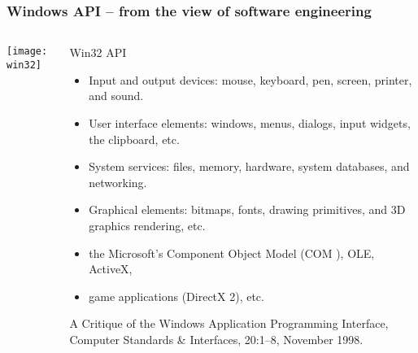 \begin{frame}[plain]
	\frametitle{Windows API -- from the view of software engineering}
	
	
	
	\begin{columns}
		
		\begin{column}{.4\textwidth}
			
			\texttt{[image: win32]}
			
		\end{column}
		
		\begin{column}{.6\textwidth}
			
			Win32 API
			
			\begin{itemize}
				\item Input and output devices: mouse, keyboard, pen, screen,
				printer, and sound.
				
				\item User interface elements: windows, menus, dialogs, input
				widgets, the clipboard, etc.
				
				\item System services: files, memory, hardware, system
				databases, and networking.
				
				\item Graphical elements: bitmaps, fonts, drawing primitives, and 3D graphics rendering, etc.
				
				\item the Microsoft's Component Object Model (COM ), OLE, ActiveX,
				
				\item game applications (DirectX 2), etc.
				
				
			\end{itemize}
			
			\tiny A Critique of the Windows	Application Programming Interface, Computer Standards \& Interfaces, 20:1–8, November 1998.
		\end{column}
		
		
	\end{columns}
	
	
\end{frame}

